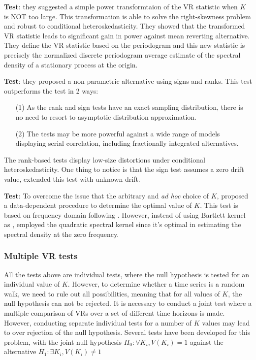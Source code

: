 \textbf{\citet{chen2006variance} Test}: they suggested a simple power transformtaion of the VR statistic when $K$ is NOT too large. This transformation is able to solve 
the right-skewness problem and robust to conditional heteroskedasticity. They showed that the transformed VR statistic leads to significant gain in power against mean reverting 
alternative. They define the VR statistic based on the periodogram and this new statistic is precisely the normalized discrete periodogram average estimate of the spectral
density of a stationary process at the origin.

\textbf{\citet{wright2000alternative} Test}: they proposed a non-parametric alternative using signs and ranks. This test outperforms the \citeauthor{lo1988stock} test in 2 ways:
\begin{enumerate}
    \item[(1)] As the rank and sign tests have an exact sampling distribution, there is no need to resort to asymptotic distribution approximation.
    \item[(2)] The tests may be more powerful against a wide range of models displaying serial correlation, including fractionally integrated alternatives.
\end{enumerate}
The rank-based tests display low-size distortions under conditional heteroskedasticity. One thing to notice is that the sign test assumes a zero drift value,
\citet{luger2003exact} extended this test with unknown drift.

\textbf{\citet{choi1999testing} Test}: To overcome the issue that the arbitrary and \textit{ad hoc} choice of $K$, \citet{choi1999testing} proposed a data-dependent procedure to
determine the optimal value of $K$. This test is based on frequency domain following \citet{cochrane1988big}. However, instead of using Bartlett kernel as \citeauthor{cochrane1988big},
\citeauthor{choi1999testing} employed the quadratic spectral kernel since it's optimal in estimating the spectral density at the zero frequency.

\subsubsection{Multiple VR tests}
All the tests above are individual tests, where the null hypothesis is tested for an individual value of $K$. However, to determine whether a time series is a random walk, we need to rule
out all possibilities, meaning that for all values of $K$, the null hypothesis can not be rejected. It is necessary to conduct a joint test where a multiple comparison of VRs over a set of
different time horizons is made. However, conducting separate individual tests for a number of $K$ values may lead to over rejection of the null hypothesis. Several tests have been developed 
for this problem, with the joint null hypothesis $H_0: \forall K_i, V(K_i)=1$ against the alternative $H_1: \exists K_i, V(K_i)\neq 1$

